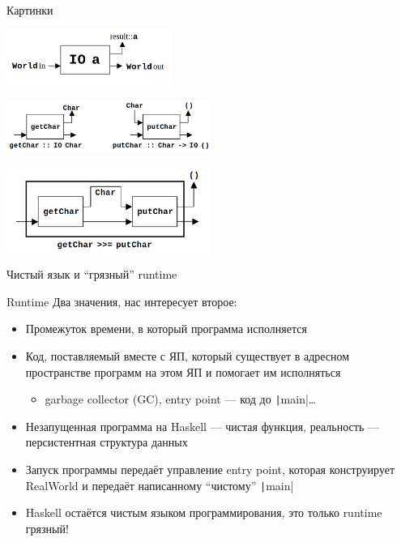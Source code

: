     \begin{frame}[fragile]{Картинки}
        \vspace{-0.5em}
        \begin{center}
            \includegraphics[width=0.4\textwidth]{figs/io1}

            \includegraphics[width=0.5\textwidth]{figs/io2}

            \includegraphics[width=0.5\textwidth]{figs/io3}
        \end{center}
    \end{frame}

    \begin{frame}[fragile]{Чистый язык и ``грязный'' runtime \popslide}
        \vspace{-0.5em}
        \begin{block}{Runtime}
            Два значения, нас интересует второе:
            \begin{itemize}
                \item[\defi] Промежуток времени, в который программа исполняется
                \item[\defi] Код, поставляемый вместе с ЯП, который существует в адресном пространстве программ на этом ЯП и помогает им исполняться
                \begin{itemize}
                    \item[\eg] garbage collector (GC), entry point --- код до \texttt|main|\ldots
                \end{itemize}
            \end{itemize}
        \end{block}
        \begin{itemize}
            \item Незапущенная программа на Haskell --- чистая функция, реальность --- персистентная структура данных
            \item Запуск программы передаёт управление entry point, которая конструирует RealWorld и передаёт написанному ``чистому'' \texttt|main|
            \item Haskell остаётся чистым языком программирования, это только runtime грязный!
        \end{itemize}
    \end{frame}

